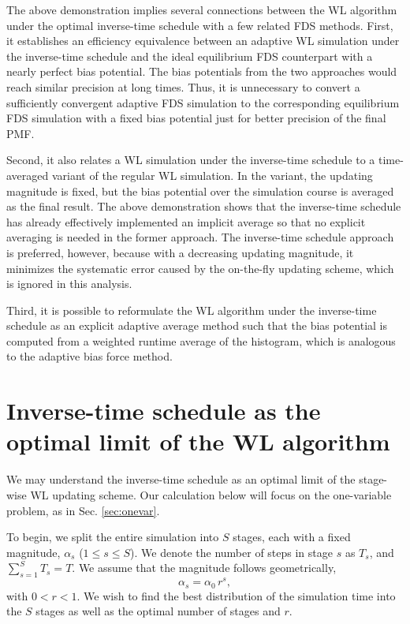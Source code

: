 \documentclass[reprint, superscriptaddress, floatfix]{revtex4-1}
\begin{document}
The above demonstration implies several connections
between the WL algorithm under the optimal inverse-time schedule
with a few related FDS methods.
%
First,
it establishes an efficiency equivalence
between an adaptive WL simulation under the inverse-time schedule
and the ideal equilibrium FDS counterpart
with a nearly perfect bias potential.
%
The bias potentials from the two approaches
would reach similar precision at long times.
%
Thus, it is unnecessary to convert
a sufficiently convergent adaptive FDS simulation
to the corresponding equilibrium FDS simulation
with a fixed bias potential just for better precision
of the final PMF.

Second,
it also relates a WL simulation under the inverse-time schedule
to a time-averaged variant of the regular WL simulation.
%
In the variant, the updating magnitude is fixed,
but the bias potential over the simulation course is averaged
as the final result\cite{zhou2005}.
%
The above demonstration shows that the inverse-time schedule
has already effectively implemented an implicit average
so that no explicit averaging is needed in the former approach.
%
The inverse-time schedule approach is preferred, however,
because with a decreasing updating magnitude,
it minimizes the systematic error caused by
the on-the-fly updating scheme\cite{
  zhou2005, zhou2008},
which is ignored in this analysis.

Third,
it is possible to reformulate the WL algorithm
under the inverse-time schedule
as an explicit adaptive average method
such that the bias potential is computed from
a weighted runtime average of the histogram\cite{
  marsili2006, barducci2008},
which is analogous to the adaptive bias force method\cite{
  darve2001, *darve2008}.






\section{\label{sec:wltoinvt}
Inverse-time schedule as the optimal limit of the WL algorithm}


We may understand the inverse-time schedule %
as an optimal limit of the stage-wise WL updating scheme.
%
Our calculation below will focus on the one-variable problem,
as in Sec. \ref{sec:onevar}.

To begin, we split the entire simulation into $S$ stages,
each with a fixed magnitude, $\alpha_s$ ($1 \le s \le S$).
%
We denote the number of steps in stage $s$ as $T_s$, and
$\sum_{s=1}^S T_s = T$.
%
%
We assume that
the magnitude follows geometrically,
%
\begin{equation}
  \alpha_s = \alpha_0 \, r^s
  ,
  \label{eq:alphas}
\end{equation}
%
with $0 < r < 1$.
%
%
We wish to find the best distribution of the simulation time
into the $S$ stages
as well as
the optimal number of stages and $r$.
\end{document}
